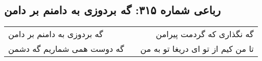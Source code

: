 \begin{center}
\section*{رباعی شماره ۳۱۵: گه بردوزی به دامنم بر دامن}
\label{sec:sh315}
\begin{longtable}{l p{0.5cm} r}
گه بردوزی به دامنم بر دامن
&&
گه نگذاری که گردمت پیرامن
\\
گه دوست همی شماریم گه دشمن
&&
تا من کیم از تو ای دریغا تو به من
\\
\end{longtable}
\end{center}
